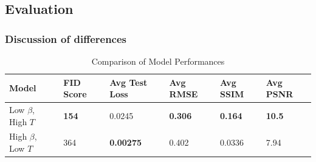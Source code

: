 \documentclass[11pt]{article}
\begin{document}
\subsection{Evaluation}
\subsubsection{Discussion of differences}
\begin{table}[H]
    \centering
    \caption{Comparison of Model Performances}
    \begin{tabular}{l|lllll}
    \hline
    Model          & FID Score           & Avg Test Loss        & Avg RMSE           & Avg SSIM         & Avg PSNR           \\ \hline
    Low $\beta$, High $T$ & \textbf{154}    & 0.0245              & \textbf{0.306}            & \textbf{0.164} & \textbf{10.5}    \\
    High $\beta$, Low $T$  & 364             & \textbf{0.00275}     & 0.402  & 0.0336          & 7.94              \\ \hline
    \end{tabular}
    \end{table}
\end{document}
